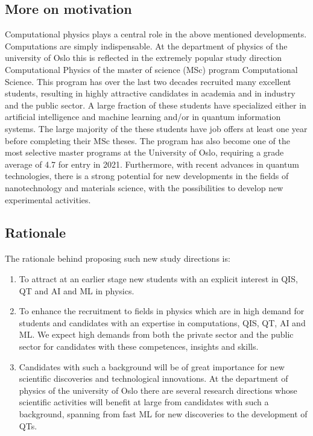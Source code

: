 \documentclass[%
oneside,                 %
final,                   %
10pt]{article}
\begin{document}
\subsection*{More on motivation}

Computational physics plays a central role in the above mentioned
developments.  Computations are simply indispensable.  At the
department of physics of the university of Oslo this is reflected in
the extremely popular study direction Computational Physics of the
master of science (MSc) program Computational Science. This program
has over the last two decades recruited many excellent students,
resulting in highly attractive candidates in academia and in industry
and the public sector. A large fraction of these students have
specialized either in artificial intelligence and machine learning
and/or in quantum information systems.  The large majority of the
these students have job offers at least one year before completing
their MSc theses. The program has also become one of the most
selective master programs at the University of Oslo, requiring a grade
average of 4.7 for entry in 2021. Furthermore, with recent advances in
quantum technologies, there is a strong potential for new developments
in the fields of nanotechnology and materials science, with the
possibilities to develop new experimental activities.

\subsection*{Rationale}


\paragraph{}
The rationale behind proposing such new study directions is:
\begin{enumerate}
\item To attract at an earlier stage new students with an explicit interest in QIS, QT and AI and ML in physics. 

\item To enhance the recruitment to fields in physics which are in high demand for students and candidates with an expertise in computations, QIS, QT, AI and ML. We expect high demands from both the private sector and the public sector for candidates with these competences, insights and skills.

\item Candidates with such a background will be of great importance for new scientific discoveries and technological innovations. At the department of physics of the university of Oslo there are several research directions whose scientific activities will benefit at large from candidates with such a background, spanning from fast ML for new discoveries to the development of QTs.   
\end{enumerate}
\end{document}
